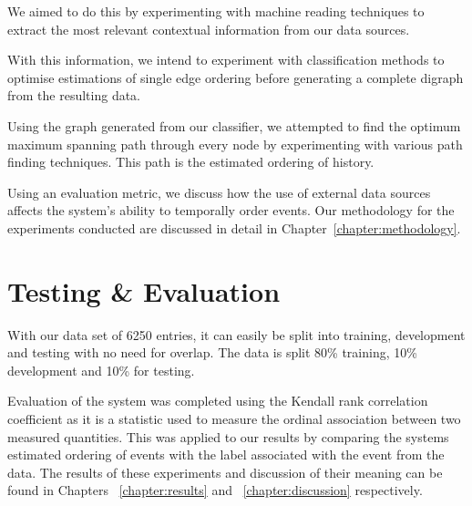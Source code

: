 \documentclass[bsc,frontabs,twoside,singlespacing,parskip,deptreport]{infthesis}     %
\begin{document}
We aimed to do this by experimenting with machine reading techniques to extract the most
relevant contextual information from our data sources.

With this information, we intend to experiment with classification methods to optimise estimations
of single edge ordering before generating a complete digraph from the resulting data.

Using the graph generated from our classifier, we attempted to find the optimum maximum spanning path
through every node by experimenting with various path finding techniques.
This path is the estimated ordering of history.


Using an evaluation metric, we discuss how the use of external data sources affects the system's ability to
temporally order events. Our methodology for the experiments conducted are discussed in detail in Chapter~\ref{chapter:methodology}.

\section{Testing \& Evaluation}
With our data set of 6250 entries, it can
easily be split into training, development and testing with no
need for overlap. The data is split 80\% training,
10\% development and 10\% for testing.

Evaluation of the system was completed using the
Kendall rank correlation coefficient as it is a statistic
used to measure the ordinal association between two
measured quantities. This was applied to our results
by comparing the systems estimated ordering of events
with the label associated with the event from the data.
The results of these experiments and discussion of their meaning can be found in Chapters ~\ref{chapter:results} and ~\ref{chapter:discussion} respectively. 
\end{document}
